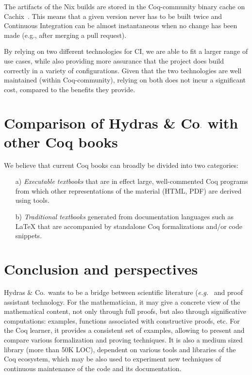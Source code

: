 \documentclass{easychair}
\newcommand{\coq}{Coq\xspace}
\newcommand{\community}{Coq-community\xspace}
\newcommand{\Hydras}{Hydras \& Co$\text.$\xspace}
\begin{document}
The artifacts of the Nix builds are stored in the \community binary cache on Cachix~\cite{cachix}.
%
This means that a given version never has to be built twice and Continuous Integration can be almost instantaneous when no change has been made (e.g., after merging a pull request).

By relying on two different technologies for CI, we are able to fit a larger range of use cases, while also providing more assurance that the project does build correctly in a variety of configurations.
%
Given that the two technologies are well maintained (within \community), relying on both does not incur a significant cost, compared to the benefits they provide.

\section{Comparison of \Hydras with other Coq books}

We believe that current Coq books can broadly be divided into two categories:
\begin{enumerate}
\item[a)] \emph{Executable textbooks} that are in effect large, well-commented Coq programs from which other representations of the material (HTML, PDF) are derived using tools.
\item[b)] \emph{Traditional textbooks} generated from documentation languages such as LaTeX that are accompanied by standalone Coq formalizations and/or code snippets.
\end{enumerate}

\section{Conclusion and perspectives}


\Hydras wants to be a bridge between scientific literature (\emph{e.g.}~\cite{KP82, KS81, schutte} and proof assistant technology. For the mathematician, it may give a concrete view of the mathematical content, not only through full proofs, but also through significative computations: examples, functions associated with constructive proofs, etc. For the \coq learner, it provides a consistent set of examples,
allowing to present and compare various formalization and proving techniques. %
It is also a medium sized library (more than 50K LOC), dependent on various tools and libraries of the \coq ecosystem, which  may be also used to experiment new techniques of continuous maintenance of the code and its documentation.
\end{document}
